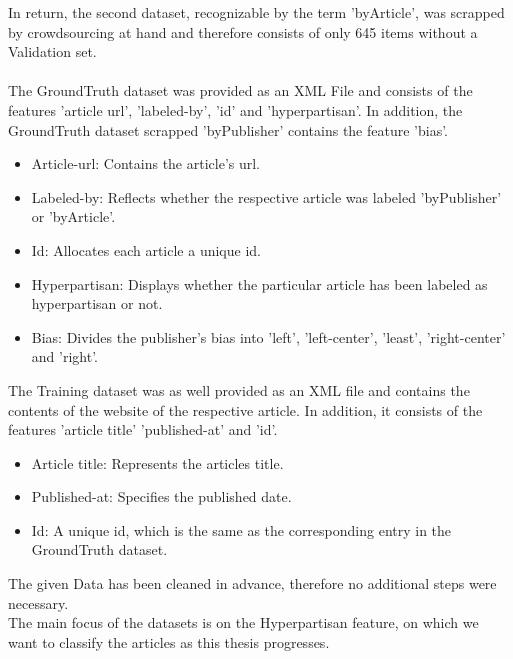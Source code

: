 \documentclass[a4paper, 11pt,titlepage,oneside,openany]{book}
\begin{document}
 \noindent In return, the second dataset, recognizable by the term 'byArticle', was scrapped by crowdsourcing at hand and therefore consists of only 645 items without a Validation set.\\
 \\
 The GroundTruth dataset was provided as an XML File and consists of the features 'article url', 'labeled-by', 'id' and 'hyperpartisan'. In addition, the GroundTruth dataset scrapped 'byPublisher' contains the feature 'bias'.
\begin{itemize}
	\item Article-url: Contains the article's url.
	\item Labeled-by: Reflects whether the respective article was labeled 'byPublisher' or 'byArticle'.
	\item Id: Allocates each article a unique id.
	\item Hyperpartisan: Displays whether the particular article has been labeled as hyperpartisan or not.
	\item Bias: Divides the publisher's bias into 'left', 'left-center', 'least', 'right-center' and 'right'.
\end{itemize}
 The Training dataset was as well provided as an XML file and contains the contents of the website of the respective article. In addition, it consists of the features 'article title' 'published-at' and 'id'.
\begin{itemize}
	\item Article title: Represents the articles title.
	\item Published-at: Specifies the published date.
	\item Id: A unique id, which is the same as the corresponding entry in the GroundTruth dataset.
\end{itemize}

 \noindent The given Data has been cleaned in advance, therefore no additional steps were necessary.\\ 
 The main focus of the datasets is on the Hyperpartisan feature, on which we want to classify the articles as this thesis progresses.
 
\end{document}
